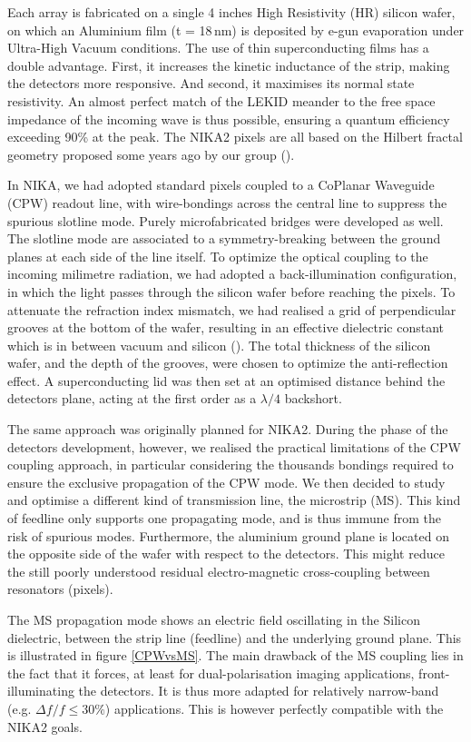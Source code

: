 \documentclass[]{aa} %
\begin{document}
Each array is fabricated on a single 4 inches High Resistivity (HR) silicon
wafer, on which an Aluminium film (t = 18\,nm) is deposited by e-gun evaporation
under Ultra-High Vacuum conditions. The use of thin superconducting films has a
double advantage. First, it increases the kinetic inductance of the strip,
making the detectors more responsive. And second, it maximises its normal state
resistivity. An almost perfect match of the LEKID meander to the free space
impedance of the incoming wave is thus possible, ensuring a quantum efficiency
exceeding 90\% at the peak. The NIKA2 pixels are all based on the Hilbert
fractal geometry proposed some years ago by our group (\cite{Roesch2012}).

In NIKA, we had adopted standard pixels coupled to a CoPlanar Waveguide (CPW)
readout line, with wire-bondings across the central line to suppress the
spurious slotline mode. Purely microfabricated bridges were developed as
well. The slotline mode are associated to a symmetry-breaking between the ground
planes at each side of the line itself. To optimize the optical coupling to the
incoming milimetre radiation, we had adopted a back-illumination configuration,
in which the light passes through the silicon wafer before reaching the
pixels. To attenuate the refraction index mismatch, we had realised a grid of
perpendicular grooves at the bottom of the wafer, resulting in an effective
dielectric constant which is in between vacuum and silicon
(\cite{Goupy2016}). The total thickness of the silicon wafer, and the depth of
the grooves, were chosen to optimize the anti-reflection effect. A
superconducting lid was then set at an optimised distance behind the detectors
plane, acting at the first order as a $\lambda/4$ backshort.

The same approach was originally planned for NIKA2. During the phase of the
detectors development, however, we realised the practical limitations of the CPW
coupling approach, in particular considering the thousands bondings required to
ensure the exclusive propagation of the CPW mode. We then decided to study and
optimise a different kind of transmission line, the microstrip (MS). This kind
of feedline only supports one propagating mode, and is thus immune from the risk
of spurious modes. Furthermore, the aluminium ground plane is located on the
opposite side of the wafer with respect to the detectors. This might reduce the
still poorly understood residual electro-magnetic cross-coupling between
resonators (pixels).

The MS propagation mode shows an electric field oscillating in the Silicon
dielectric, between the strip line (feedline) and the underlying ground
plane. This is illustrated in figure \ref{CPWvsMS}. The main drawback of the MS
coupling lies in the fact that it forces, at least for dual-polarisation imaging
applications, front-illuminating the detectors. It is thus more adapted for
relatively narrow-band (e.g. $\Delta f / f \leq 30 \%$) applications. This is
however perfectly compatible with the NIKA2 goals.
\end{document}
